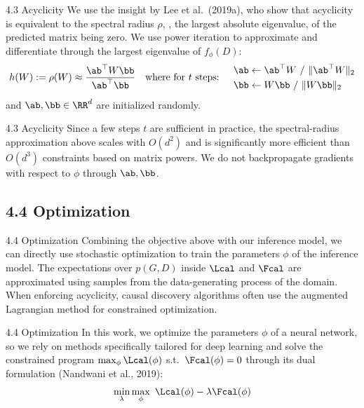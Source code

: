 \documentclass[aspectratio=169,10pt]{beamer}
\begin{document}
\begin{frame}{4.3 Acyclicity}
\small
We use the insight by Lee et al.\ (2019a), who show that acyclicity is equivalent to the spectral radius $\rho$, \ie, the largest absolute eigenvalue, of the predicted matrix being zero. We use power iteration to approximate and differentiate through the largest eigenvalue of $f_\phi(D)$:
\begin{align*}
    h(W) := \rho(W) \approx \frac{\ab^\top W \bb}{\ab^\top \bb} ~~~\text{where for $t$ steps: }  ~~~
    \begin{aligned}
        \ab &\gets \ab^\top W ~/~ \lVert \ab^\top W  \rVert_2 \\
        \bb &\gets W\bb ~/~ \lVert W\bb \rVert_2
    \end{aligned}
\end{align*}
and $\ab, \bb \in \RR^d$ are initialized randomly.
\end{frame}

\begin{frame}{4.3 Acyclicity}
Since a few steps $t$ are sufficient in practice, the spectral-radius approximation above scales with $O(d^2)$ and is significantly more efficient than $O(d^3)$ constraints based on matrix powers. We do not backpropagate gradients with respect to $\phi$ through $\ab, \bb$.
\end{frame}

\subsection{4.4 Optimization}

\begin{frame}{4.4 Optimization}
Combining the objective above with our inference model, we can directly use stochastic optimization to train the parameters $\phi$ of the inference model. The expectations over $p(G, D)$ inside $\Lcal$ and $\Fcal$ are approximated using samples from the data-generating process of the domain. When enforcing acyclicity, causal discovery algorithms often use the augmented Lagrangian method for constrained optimization.
\end{frame}

\begin{frame}{4.4 Optimization}
In this work, we optimize the parameters $\phi$ of a neural network, so we rely on methods specifically tailored for deep learning and solve the constrained program $\max_\phi \Lcal(\phi)$ s.t.\ $\Fcal(\phi) = 0$ through its dual formulation (Nandwani et al., 2019):
\begin{align*}
	\min_\lambda \max_\phi~ \Lcal(\phi) - \lambda \Fcal(\phi)
\end{align*}
\end{frame}
\end{document}
